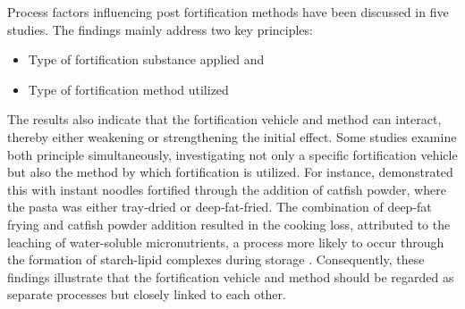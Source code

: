 Process factors influencing post fortification methods have been discussed in five studies. The findings mainly address two key principles:
\begin{itemize}
\item Type of fortification substance applied and
\item Type of fortification method utilized
\end{itemize}
The results also indicate that the fortification vehicle and method can interact, thereby either weakening or strengthening the initial effect. Some studies examine both principle simultaneously, investigating not only a specific fortification vehicle but also the method by which fortification is utilized. For instance, \citet{noodle} demonstrated this with instant noodles fortified through the addition of catfish powder, where the pasta was either tray‑dried or deep‑fat‑fried. The combination of deep-fat frying and catfish powder addition resulted in the cooking loss, attributed to the leaching of water-soluble micronutrients, a process more likely to occur through the formation of starch-lipid complexes during storage \autocite{starch}. Consequently, these findings illustrate that the fortification vehicle and method should be regarded as separate processes but closely linked to each other.

\par

